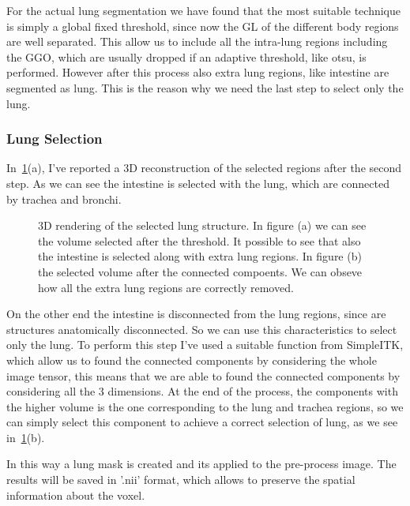 \documentclass{standalone}
\begin{document}
	For the actual lung segmentation we have found that the most suitable technique is simply a global fixed threshold, since now the GL of the different body regions are well separated. This allow us to include all the intra-lung regions including the GGO, which are usually dropped if an adaptive threshold, like otsu, is performed.
	However after this process  also extra lung regions, like intestine are segmented as lung. This is the reason why we need the last step to select only the lung.
	
	\subsubsection*{Lung Selection}
	
	In \figurename\,\ref{fig:lungSelection}(a), I've reported a 3D reconstruction of the selected regions after the second step. As we can see the intestine is selected with the lung, which are connected by trachea and bronchi. 
	
	
	
	\begin{figure}[h]
		\centering
		\label{fig:lungSelection}\caption{3D rendering of the selected lung structure. In figure (a) we can see the volume selected after the threshold. It possible to see that also the intestine is selected along with extra lung regions. In figure (b) the selected volume after the connected compoents. We can obseve how all the extra lung regions are correctly removed.} 
	\end{figure}
	
	On the other end the intestine is disconnected from the lung regions, since are structures anatomically disconnected. So we can use this characteristics to select only the lung. To perform this step I've used a suitable function from SimpleITK, which allow us to found the connected components by considering the whole image tensor, this means that we are able to found the connected components by considering all the 3 dimensions. At the end of the process, the components with the higher volume is the one corresponding to the lung and trachea regions, so we can simply select this component to achieve a correct selection of lung, as we see in \figurename\,\ref{fig:lungSelection}(b).
	
	
	In this way a lung mask is created and its applied to the pre-process image. The results will be saved in '.nii' format, which allows to preserve the spatial information about the voxel.
	
	
	
		
\end{document}

